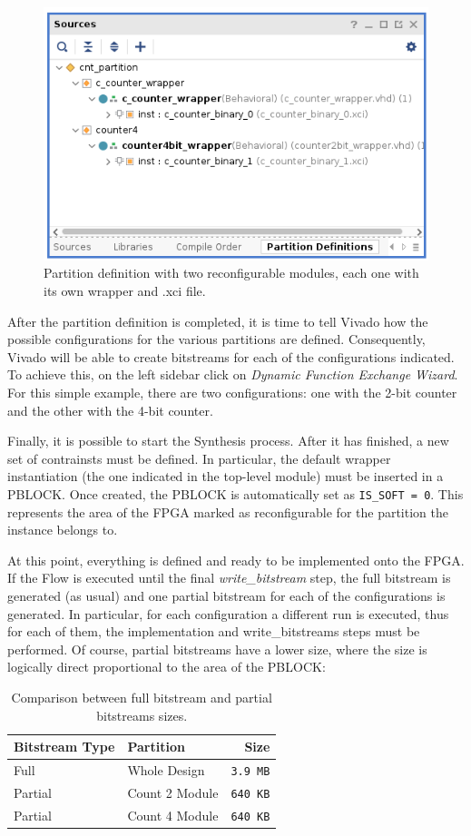 \begin{figure}[H]
\centering
\includegraphics[width=0.80\linewidth]{images/chapter4/parts.png}
\caption{Partition definition with two reconfigurable modules, each one with its own wrapper and .xci file.}
\end{figure}

After the partition definition is completed, it is time to tell Vivado how the possible configurations for the various partitions are defined. Consequently, Vivado will be able to create bitstreams for each of the configurations indicated. To achieve this, on the left sidebar click on \textit{Dynamic Function Exchange Wizard}. For this simple example, there are two configurations: one with the 2-bit counter and the other with the 4-bit counter. \bigskip

Finally, it is possible to start the Synthesis process. After it has finished, a new set of contrainsts must be defined. In particular, the default wrapper instantiation (the one indicated in the top-level module) must be inserted in a PBLOCK. Once created, the PBLOCK is automatically set as \texttt{IS_SOFT = 0}. This represents the area of the FPGA marked as reconfigurable for the partition the instance belongs to.\bigskip

At this point, everything is defined and ready to be implemented onto the FPGA. If the Flow is executed until the final \textit{write_bitstream} step, the full bitstream is generated (as usual) and one partial bitstream for each of the configurations is generated. In particular, for each configuration a different run is executed, thus for each of them, the implementation and write_bitstreams steps must be performed. Of course, partial bitstreams have a lower size, where the size is logically direct proportional to the area of the PBLOCK:

\begin{table}[H]
\centering
\begin{tabular}{ l|lr }
    \textbf{Bitstream Type}&\textbf{Partition}&\textbf{Size}\\
    \hline
    Full&Whole Design&\texttt{3.9 MB}\\
    Partial&Count 2 Module&\texttt{640 KB}\\
    Partial&Count 4 Module&\texttt{640 KB}\\
\end{tabular}
\caption{Comparison between full bitstream and partial bitstreams sizes.}
\end{table}


